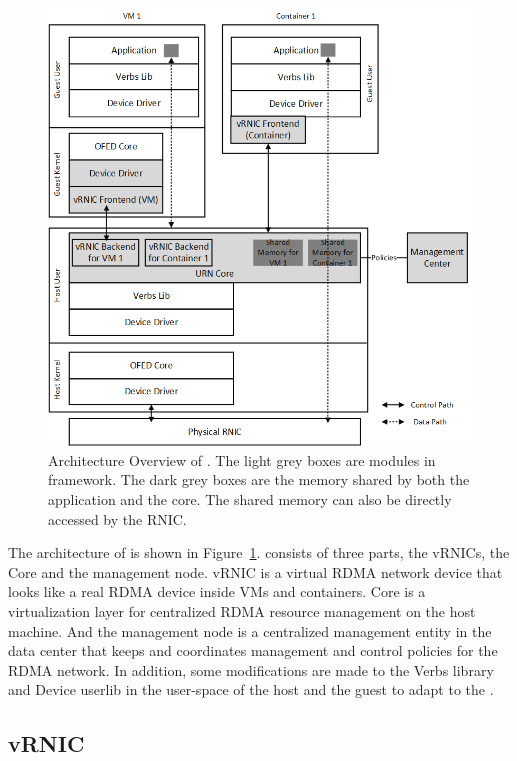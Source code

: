\begin{figure}[!ht]
	\centering
	\includegraphics[width=1\linewidth]{images/framework-overview.png}
	\caption{Architecture Overview of \sys. The light grey boxes are modules in \sys framework. The dark grey boxes are the memory shared by both the application and the \sys core. The shared memory can also be directly accessed by the RNIC.}
	\label{fig:framework-overview}
\end{figure}

The architecture of \sys is shown in Figure~\ref{fig:framework-overview}.
\sys consists of three parts, the vRNICs, the \sys Core and the management node. vRNIC is a virtual RDMA network device that looks like a real RDMA device inside VMs and containers. \sys Core is a virtualization layer for centralized RDMA resource management on the host machine. And the management node is a centralized management entity in the data center that keeps and coordinates management and control policies for the RDMA network.
In addition, some modifications are made to the Verbs library and Device userlib in the user-space of the host and the guest to adapt to the \sys.

\subsection{vRNIC}

